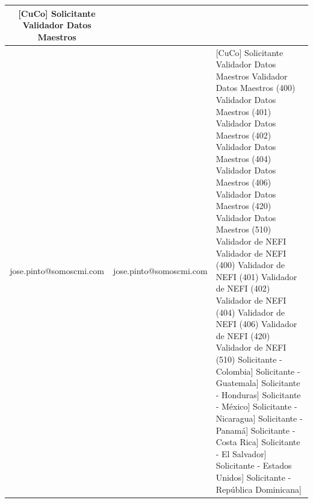 \begin{longtable}{|c|c|p{7cm}|}
        [CuCo] Solicitante \newline
        [CuCo] Validador Datos Maestros
        \\
        \hline
        jose.pinto@somoscmi.com & jose.pinto@somoscmi.com & 
        [CuCo] Solicitante \newline
        [CuCo] Validador Datos Maestros \newline
        [CuCo] Validador Datos Maestros (400) \newline
        [CuCo] Validador Datos Maestros (401) \newline
        [CuCo] Validador Datos Maestros (402) \newline
        [CuCo] Validador Datos Maestros (404) \newline
        [CuCo] Validador Datos Maestros (406) \newline
        [CuCo] Validador Datos Maestros (420) \newline
        [CuCo] Validador Datos Maestros (510) \newline
        [CuCo] Validador de NEFI \newline
        [CuCo] Validador de NEFI (400) \newline
        [CuCo] Validador de NEFI (401) \newline
        [CuCo] Validador de NEFI (402) \newline
        [CuCo] Validador de NEFI (404) \newline
        [CuCo] Validador de NEFI (406) \newline
        [CuCo] Validador de NEFI (420) \newline
        [CuCo] Validador de NEFI (510) \newline
        [[CuCo] Solicitante - Colombia] \newline
        [[CuCo] Solicitante - Guatemala] \newline
        [[CuCo] Solicitante - Honduras] \newline
        [[CuCo] Solicitante - México] \newline
        [[CuCo] Solicitante - Nicaragua] \newline
        [[CuCo] Solicitante - Panamá] \newline
        [[CuCo] Solicitante - Costa Rica] \newline
        [[CuCo] Solicitante - El Salvador] \newline
        [[CuCo] Solicitante - Estados Unidos] \newline
        [[CuCo] Solicitante - República Dominicana] \newline

\end{longtable}
